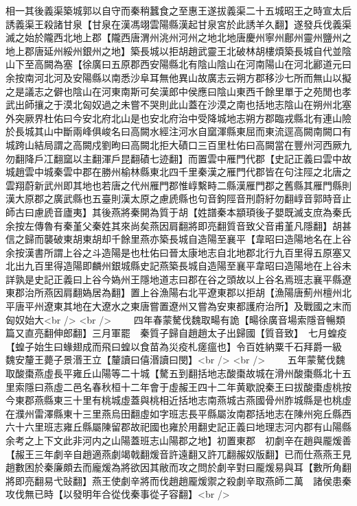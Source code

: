相一其後義渠築城郭以自守而秦稍蠶食之至惠王遂拔義渠二十五城昭王之時宣太后誘義渠王殺諸甘泉【甘泉在漢馮翊雲陽縣漢起甘泉宮於此誘羊久翻】遂發兵伐義渠滅之始於隴西北地上郡【隴西唐渭州洮州河州之地北地唐慶州寧州鄜州靈州鹽州之地上郡唐延州綏州銀州之地】築長城以拒胡趙武靈王北破林胡樓煩築長城自代並陰山下至高闕為塞【徐廣曰五原郡西安陽縣北有陰山陰山在河南陽山在河北酈道元曰余按南河北河及安陽縣以南悉沙阜耳無他異山故廣志云朔方郡移沙七所而無山以擬之是議志之僻也陰山在河東南斯可矣漢郎中侯應曰陰山東西千餘里單于之苑閒也孝武出師攘之于漠北匈奴過之未嘗不哭則此山蓋在沙漠之南也括地志陰山在朔州北塞外突厥界杜佑曰今安北府北山是也安北府治中受降城地志朔方郡臨戎縣北有連山險於長城其山中斷兩峰俱峻名曰高闕水經注河水自窳渾縣東屈而東流逕高闕南闕口有城跨山結局謂之高闕戍劉昫曰高闕北拒大磧口三百里杜佑曰高闕當在豐州河西厥九勿翻降戶冮翻窳以主翻渾戶昆翻磧七迹翻】而置雲中雁門代郡【史記正義曰雲中故城趙雲中城秦雲中郡在勝州榆林縣東北四千里秦漢之雁門代郡皆在句注陘之北唐之雲翔蔚新武州即其地也若唐之代州雁門郡惟崞繫畤二縣漢雁門郡之舊縣其雁門縣則漢大原郡之廣武縣也五臺則漢太原之慮虒縣也句音鉤陘音刑蔚紆勿翻崞音郭時音止師古曰慮虒音廬夷】其後燕將秦開為質于胡【姓譜秦本顓頊後子嬰既滅支庶為秦氏余按左傳魯有秦堇父秦姓其來尚矣燕因肩翻將即亮翻質音致父音甫堇凡隱翻】胡甚信之歸而襲破東胡東胡却千餘里燕亦築長城自造陽至襄平【韋昭曰造陽地名在上谷余按漢書所謂上谷之斗造陽是也杜佑曰晉太康地志自北地郡北行九百里得五原塞又北出九百里得造陽即麟州銀城縣史記燕築長城自造陽至襄平韋昭曰造陽地在上谷未詳孰是史記正義曰上谷今媯州王隱地道志曰郡在谷之頭故以上谷名焉班志襄平縣遼東郡治所燕因肩翻媯居為翻】置上谷漁陽右北平遼東郡以拒胡【漁陽唐薊州檀州北平唐平州遼東其地在大遼水之東唐嘗置遼州又嘗為安東都護府治所】及戰國之末而匈奴始大<br />
<br />
　　四年春蒙驁伐魏取畼有詭【畼徐廣音場索隱音暢類篇又直亮翻伸郎翻】三月軍罷　秦質子歸自趙趙太子出歸國【質音致】　七月蝗疫【蝗子始生曰蝝翅成而飛曰蝗以食苗為災疫札瘥瘟也】令百姓納粟千石拜爵一級　魏安釐王薨子景湣王立【釐讀曰僖湣讀曰閔】<br />
<br />
　　五年蒙驁伐魏取酸棗燕虛長平雍丘山陽等二十城【驁五到翻括地志酸棗故城在滑州酸棗縣北十五里索隱曰燕虛二邑名春秋桓十二年會于虛赧王四十二年黄歇說秦王曰拔酸棗虛桃按今東郡燕縣東三十里有桃城虛蓋與桃相近括地志南燕城古燕國骨州胙城縣是也桃虛在濮州雷澤縣東十三里燕烏田翻虛如字班志長平縣屬汝南郡括地志在陳州宛丘縣西六十六里班志雍丘縣屬陳留郡故祀國也雍於用翻史記正義曰地理志河内郡有山陽縣余考之上下文此非河内之山陽蓋班志山陽郡之地】初置東郡　初劇辛在趙與龎煖善【赧王三年劇辛自趙適燕劇竭戟翻煖音許遠翻又許兀翻赧奴版翻】已而仕燕燕王見趙數困於秦廉頗去而龐煖為將欲因其敝而攻之問於劇辛對曰龎煖易與耳【數所角翻將即亮翻易弋䜴翻】燕王使劇辛將而伐趙趙龎煖禦之殺劇辛取燕師二萬　諸侯患秦攻伐無已時【以發明年合從伐秦事從子容翻】<br />
